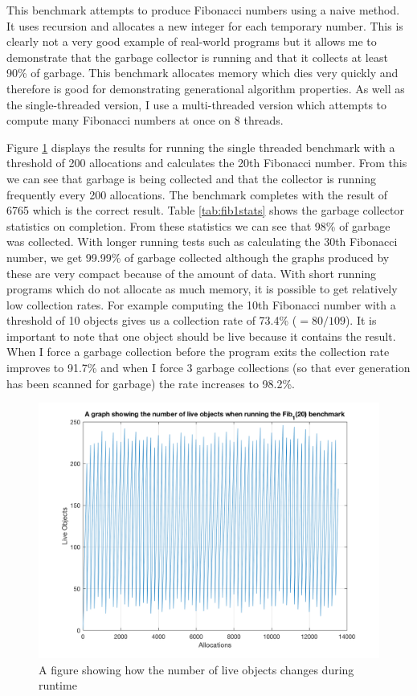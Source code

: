 \documentclass[../diss.tex]{subfiles}
\begin{document}
This benchmark attempts to produce Fibonacci numbers using a naive method. It uses recursion and allocates a new integer for each temporary number. This is clearly not a very good example of real-world programs but it allows me to demonstrate that the garbage collector is running and that it collects at least 90\% of garbage. This benchmark allocates memory which dies very quickly and therefore is good for demonstrating generational algorithm properties. As well as the single-threaded version, I use a multi-threaded version which attempts to compute many Fibonacci numbers at once on 8 threads.

Figure \ref{fig:fib1graph} displays the results for running the single threaded benchmark with a threshold of 200 allocations and calculates the 20th Fibonacci number. From this we can see that garbage is being collected and that the collector is running frequently every 200 allocations. The benchmark completes with the result of 6765 which is the correct result. Table \ref{tab:fib1stats} shows the garbage collector statistics on completion. From these statistics we can see that 98\% of garbage was collected. With longer running tests such as calculating the 30th Fibonacci number, we get 99.99\% of garbage collected although the graphs produced by these are very compact because of the amount of data. With short running programs which do not allocate as much memory, it is possible to get relatively low collection rates. For example computing the 10th Fibonacci number with a threshold of 10 objects gives us a collection rate of 73.4\% ($=80/109$). It is important to note that one object should be live because it contains the result. When I force a garbage collection before the program exits the collection rate improves to 91.7\% and when I force 3 garbage collections (so that ever generation has been scanned for garbage) the rate increases to 98.2\%.

\begin{figure}
    \centering
    \includegraphics[max width=\linewidth]{figs/fib1.png}
    \caption{A figure showing how the number of live objects changes during runtime}
    \label{fig:fib1graph}
\end{figure}
\end{document}
